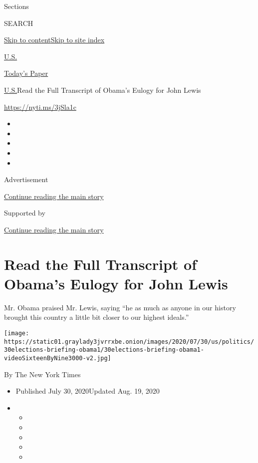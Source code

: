 Sections

SEARCH

\protect\hyperlink{site-content}{Skip to
content}\protect\hyperlink{site-index}{Skip to site index}

\href{https://www.nytimes3xbfgragh.onion/section/us}{U.S.}

\href{https://myaccount.nytimes3xbfgragh.onion/auth/login?response_type=cookie\&client_id=vi}{}

\href{https://www.nytimes3xbfgragh.onion/section/todayspaper}{Today's
Paper}

\href{/section/us}{U.S.}\textbar{}Read the Full Transcript of Obama's
Eulogy for John Lewis

\url{https://nyti.ms/3jSla1c}

\begin{itemize}
\item
\item
\item
\item
\item
\end{itemize}

Advertisement

\protect\hyperlink{after-top}{Continue reading the main story}

Supported by

\protect\hyperlink{after-sponsor}{Continue reading the main story}

\hypertarget{read-the-full-transcript-of-obamas-eulogy-for-john-lewis}{%
\section{Read the Full Transcript of Obama's Eulogy for John
Lewis}\label{read-the-full-transcript-of-obamas-eulogy-for-john-lewis}}

Mr. Obama praised Mr. Lewis, saying ``he as much as anyone in our
history brought this country a little bit closer to our highest
ideals.''

\texttt{[image: https://static01.graylady3jvrrxbe.onion/images/2020/07/30/us/politics/30elections-briefing-obama1/30elections-briefing-obama1-videoSixteenByNine3000-v2.jpg]}

By The New York Times

\begin{itemize}
\item
  Published July 30, 2020Updated Aug. 19, 2020
\item
  \begin{itemize}
  \item
  \item
  \item
  \item
  \item
  \end{itemize}
\end{itemize}


